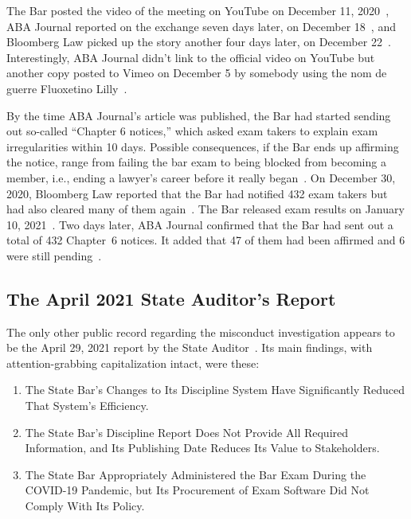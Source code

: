 \sectionbreak

\noindent{}The Bar posted the video of the meeting on YouTube on December 11,
2020~\cite{CommitteeOfBarExaminers2020}, ABA Journal reported on the exchange
seven days later, on December 18~\cite{FrancisWardMoran2020}, and Bloomberg Law
picked up the story another four days later, on December 22~\cite{Skolnik2020a}.
Interestingly, ABA Journal didn't link to the official video on YouTube but
another copy posted to Vimeo on December 5 by somebody using the nom de guerre
Fluoxetino Lilly~\cite{Lilly2020}.

By the time ABA Journal's article was published, the Bar had started sending out
so-called ``Chapter 6 notices,'' which asked exam takers to explain exam
irregularities within 10 days. Possible consequences, if the Bar ends up
affirming the notice, range from failing the bar exam to being blocked from
becoming a member, i.e., ending a lawyer's career before it really
began~\cite{TheStateBarOfCalifornia2019}. On December 30, 2020, Bloomberg Law
reported that the Bar had notified 432 exam takers but had also cleared many of
them again~\cite{Skolnik2020}. The Bar released exam results on January 10,
2021~\cite{TheStateBarOfCalifornia2021h}. Two days later, ABA Journal confirmed
that the Bar had sent out a total of 432 Chapter~6 notices. It added that 47 of
them had been affirmed and 6 were still pending~\cite{FrancisWard2021b}.


\subsection{The April 2021 State Auditor's Report}
\label{adx:barexam:audit}

The only other public record regarding the misconduct investigation appears to
be the April 29, 2021 report by the State Auditor~\cite{Howle2021}. Its main
findings, with attention-grabbing capitalization intact, were these:

\begin{enumerate}
\item The State Bar's Changes to Its Discipline System Have Significantly
    Reduced That System's Efficiency.
\item The State Bar's Discipline Report Does Not Provide All Required
    Information, and Its Publishing Date Reduces Its Value to Stakeholders.
\item The State Bar Appropriately Administered the Bar Exam During the COVID-19
    Pandemic, but Its Procurement of Exam Software Did Not Comply With Its
    Policy.
\end{enumerate}

